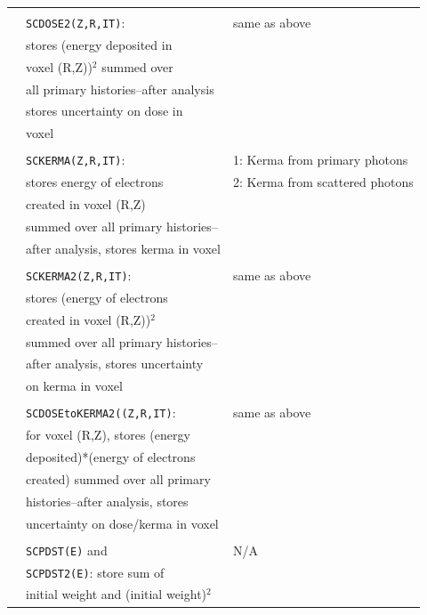 \documentclass[12pt,twoside]{article}  %
\begin{document}
\begin{longtable}{lll}
          &                       & \\
          & {\tt SCDOSE2(Z,R,IT)}:  & same as above\\
          & stores (energy deposited in &\\
          & voxel (R,Z))$^2$ summed over &\\
          & all primary histories--after analysis &\\
          & stores uncertainty on dose in&\\
          & voxel &\\
          &                       & \\
          & {\tt SCKERMA(Z,R,IT)}: & 1: Kerma from primary photons\\
          & stores energy of electrons & 2: Kerma from scattered photons\\
          & created in voxel (R,Z) &\\
          & summed over all primary histories--&\\
          & after analysis, stores kerma in voxel&\\
          &                        &\\
          & {\tt SCKERMA2(Z,R,IT)}: & same as above\\
          & stores (energy of electrons &\\
          & created in voxel (R,Z))$^2$ &\\
          & summed over all primary histories--&\\
          & after analysis, stores uncertainty&\\
          & on kerma in voxel &\\
          &                   &\\
          & {\tt SCDOSEtoKERMA2((Z,R,IT)}: & same as above\\
          & for voxel (R,Z), stores (energy&\\
          & deposited)*(energy of electrons&\\
          & created) summed over all primary&\\
          & histories--after analysis, stores&\\
          & uncertainty on dose/kerma in voxel&\\
          &&\\
          & {\tt SCPDST(E)} and & N/A\\
          & {\tt SCPDST2(E)}: store sum of&\\
          & initial weight and (initial weight)$^2$&\\

\end{longtable}
\end{document}
